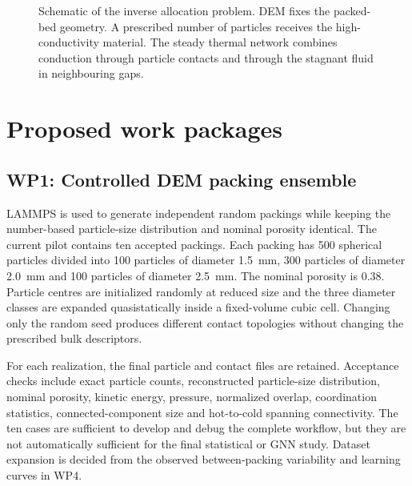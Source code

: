\documentclass[12pt,a4paper]{article}
\begin{document}
\begin{figure}[!htbp]
\caption{Schematic of the inverse allocation problem. DEM fixes the packed-bed
geometry. A prescribed number of particles receives the high-conductivity
material. The steady thermal network combines conduction through particle
contacts and through the stagnant fluid in neighbouring gaps.}
\label{fig:problem}
\end{figure}

\section{Proposed work packages}

\subsection*{WP1: Controlled DEM packing ensemble}

LAMMPS is used to generate independent random packings while keeping the
number-based particle-size distribution and nominal porosity identical. The
current pilot contains ten accepted packings. Each packing has 500 spherical
particles divided into 100 particles of diameter 1.5~mm, 300 particles of
diameter 2.0~mm and 100 particles of diameter 2.5~mm. The nominal porosity is
0.38. Particle centres are initialized randomly at reduced size and the three
diameter classes are expanded quasistatically inside a fixed-volume cubic cell.
Changing only the random seed produces different contact topologies without
changing the prescribed bulk descriptors.

For each realization, the final particle and contact files are retained.
Acceptance checks include exact particle counts, reconstructed particle-size
distribution, nominal porosity, kinetic energy, pressure, normalized overlap,
coordination statistics, connected-component size and hot-to-cold spanning
connectivity. The ten cases are sufficient to develop and debug the complete
workflow, but they are not automatically sufficient for the final statistical
or GNN study. Dataset expansion is decided from the observed between-packing
variability and learning curves in WP4.
\end{document}

